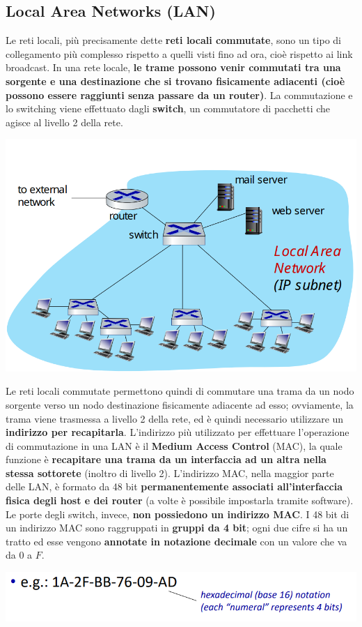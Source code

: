 \documentclass[12pt]{article}
\begin{document}
\subsection{Local Area Networks (LAN)}
Le reti locali, più precisamente dette \textbf{reti locali commutate}, sono un tipo di collegamento
più complesso rispetto a quelli visti fino ad ora, cioè rispetto ai link broadcast. In una rete locale, \textbf{le trame possono venir commutati tra una sorgente e una destinazione che si trovano fisicamente adiacenti (cioè possono essere raggiunti senza passare da un router)}.
La commutazione e lo switching viene effettuato dagli \textbf{switch}, un commutatore di pacchetti che agisce al livello 2 della rete.
\begin{center}
    \includegraphics[width =0.60\linewidth]{Images/124.png}
\end{center}
Le reti locali commutate permettono quindi di commutare una trama da un nodo sorgente verso un nodo destinazione fisicamente adiacente ad esso; ovviamente, la trama viene trasmessa a livello 2 della rete, ed è quindi
necessario utilizzare un \textbf{indirizzo per recapitarla}. L'indirizzo più utilizzato per effettuare l'operazione di commutazione in una LAN è il \textbf{Medium Access Control} (MAC), la quale funzione è \textbf{recapitare una trama da un interfaccia ad un altra nella stessa sottorete} (inoltro di livello 2).
L'indirizzo MAC, nella maggior parte delle LAN, è formato da 48 bit \textbf{permanentemente associati all'interfaccia fisica degli host e dei router} (a volte è possibile impostarla tramite software).
Le porte degli switch, invece, \textbf{non possiedono un indirizzo MAC}. 
I 48 bit di un indirizzo MAC sono raggruppati in \textbf{gruppi da 4 bit}; ogni due cifre si ha un tratto ed esse vengono \textbf{annotate in notazione decimale} con un valore che va da $0$ a $F$.
\begin{center}
    \includegraphics[width =0.60\linewidth]{Images/125.png}
\end{center}
\end{document}
